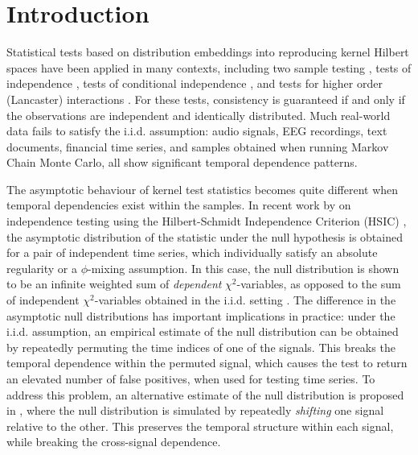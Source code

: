 \documentclass{article} %
\begin{document}
\vspace{-4mm}
\section{Introduction}
\vspace{-3mm}


Statistical tests based on distribution embeddings into reproducing kernel Hilbert spaces have been applied in many contexts,  including two sample testing \cite{HarBacMou08,gretton2012kernel,SugSuzItoKanetal11}, tests of independence \cite{gretton_kernel_2008,ZhaPetJanSch11,besserve_statistical_2013}, tests of conditional independence  \cite{fukumizu2007kernel,ZhaPetJanSch11}, and tests for higher order (Lancaster) interactions \cite{sejdinovic2013kernel}. %
For these tests,  consistency is guaranteed if and only if the observations are independent and identically distributed. 
Much real-world data fails to satisfy the i.i.d. assumption: audio signals, EEG recordings, text documents, financial time series, and samples obtained when running Markov Chain Monte Carlo, all show  significant temporal dependence patterns.  

The asymptotic behaviour of kernel test statistics becomes quite different when temporal dependencies exist within
the samples.
In recent work by  on independence testing using the Hilbert-Schmidt Independence
Criterion (HSIC) \cite{chwialkowski2014kernel}, the asymptotic distribution of the statistic under the null hypothesis is obtained
for a pair of independent time series, which individually satisfy an absolute regularity or a $\phi$-mixing assumption.
In this case, the null distribution is shown to be
an infinite weighted sum of {\em dependent} $\chi^2$-variables,
as opposed to the sum of independent $\chi^2$-variables obtained in the i.i.d. setting \cite{gretton_kernel_2008}.
The difference in the asymptotic null distributions has important implications in practice:
under the i.i.d. assumption, an empirical estimate of the null distribution can be obtained by
repeatedly permuting the time indices of one of the signals. This breaks
the temporal dependence within the permuted signal, which causes the test to return an elevated
number of false positives, when used for testing time series. To address this problem, an alternative estimate of the null distribution
is proposed in \cite{chwialkowski2014kernel}, where the null distribution is simulated by repeatedly
{\em shifting} one
signal relative to the other. This preserves the temporal structure within each signal, while breaking the cross-signal
dependence.
\end{document}
